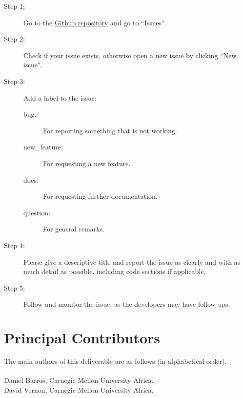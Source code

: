 \documentclass{CSSRforAfrica}
\newcommand{\blank}{~\\}
\begin{document}
\begin{description}
    \item[Step 1:] Go to the \href{https://github.com/danielcortezbarros/peppertrace}{Github repository} and go to ``Issues".

    \item[Step 2:] Check if your issue exists, otherwise open a new issue by clicking ``New issue".

    \item[Step 3:] Add a label to the issue:
    \begin{description}
        \item[bug:] For reporting something that is not working.
        \item[new\_feature:] For requesting a new feature.
        \item[docs:] For requesting further documentation.
        \item[question:] For general remarks.
    \end{description}

    \item[Step 4:] Please give a descriptive title and report the issue as clearly and with as much detail as possible, including code sections if applicable.

    \item[Step 5:] Follow and monitor the issue, as the developers may have follow-ups.
\end{description}



%



\pagebreak
\section*{Principal Contributors}
\label{contributors}
The main authors of this deliverable are as follows (in alphabetical order).
\blank
~
\blank
Daniel Barros, Carnegie Mellon University Africa.\\    %
David Vernon, Carnegie Mellon University Africa.\\    %
 
\end{document}
